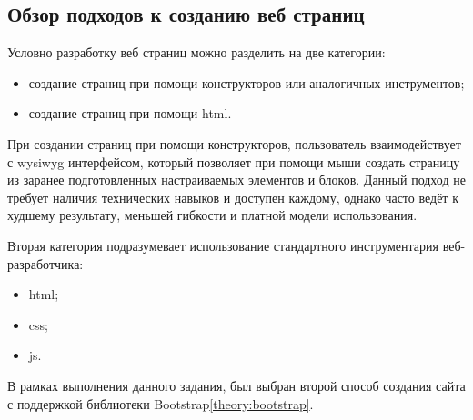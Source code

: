 \subsection{Обзор подходов к созданию веб страниц}

Условно разработку веб страниц можно разделить на две категории:
\begin{itemize}
	\item создание страниц при помощи конструкторов или аналогичных инструментов;
	\item создание страниц при помощи \gls{html}.
\end{itemize}

При создании страниц при помощи конструкторов, пользователь взаимодействует с \gls{wysiwyg} интерфейсом, который позволяет при помощи мыши создать страницу из заранее подготовленных настраиваемых элементов и блоков. Данный подход не требует наличия технических навыков и доступен каждому, однако часто ведёт к худшему результату, меньшей гибкости и платной модели использования.

Вторая категория подразумевает использование стандартного инструментария веб-разработчика:

\begin{itemize}
	\item \gls{html};
	\item \gls{css};
	\item \gls{js}.
\end{itemize}

В рамках выполнения данного задания, был выбран второй способ создания сайта с поддержкой библиотеки Bootstrap\ref{theory:bootstrap}.